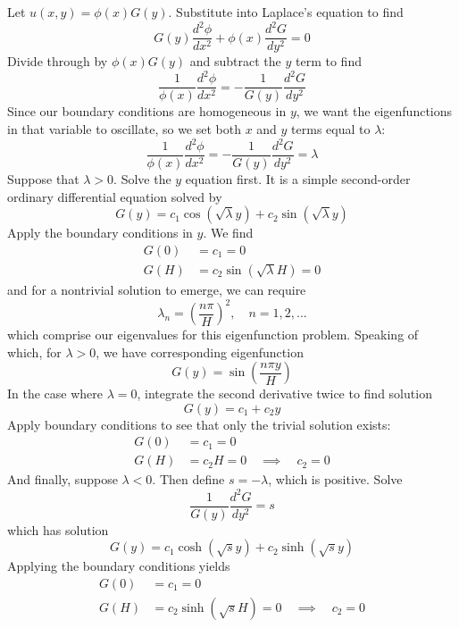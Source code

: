 \documentclass[a4paper]{article}
\begin{document}
Let \( u \!\left( x,y \right) = \phi \!\left( x \right) G \!\left( y \right) \). Substitute into Laplace's equation to find
\[
	G \!\left( y \right)\frac{d^2 \phi}{d x^2} + \phi \!\left( x \right)\frac{d^2 G}{d y^2} = 0 
\]
Divide through by \( \phi \!\left( x \right)G \!\left( y \right) \) and subtract the \( y \) term to find
\[
	\frac{1}{\phi \!\left( x \right)}\frac{d^2 \phi}{d x^2} = -\frac{1}{G \!\left( y \right)}\frac{d^2 G}{d y^2} 
\]
Since our boundary conditions are homogeneous in \( y \), we want the eigenfunctions in that variable to oscillate, so we set both \( x \) and \( y \) terms equal to \( \lambda \):
\[
	\frac{1}{\phi \!\left( x \right)}\frac{d^2 \phi}{d x^2} = -\frac{1}{G \!\left( y \right)}\frac{d^2 G}{d y^2} = \lambda
\]
Suppose that \( \lambda > 0 \). Solve the \( y \) equation first. It is a simple second-order ordinary differential equation solved by
\[
	G \!\left( y \right) = c_{1}\cos\!\left(\sqrt{\lambda}y\right) + c_{2}\sin\!\left(\sqrt{\lambda}y\right) 
\]
Apply the boundary conditions in \( y \). We find
\begin{align*}
	G \!\left( 0 \right) & = c_{1} = 0 \\
	G \!\left( H \right) & = c_{2}\sin\!\left(\sqrt{\lambda}H\right) = 0
\end{align*}
and for a nontrivial solution to emerge, we can require
\[
	\lambda_{n} = \!\left( \frac{n \pi}{H} \right)^{2}, \quad n = 1, 2, ...
\]
which comprise our eigenvalues for this eigenfunction problem. Speaking of which, for \( \lambda > 0 \), we have corresponding eigenfunction
\[
	G \!\left( y \right) = \sin\!\left(\frac{n \pi y}{H}\right) 
\]
In the case where \( \lambda = 0 \), integrate the second derivative twice to find solution
\[
	G \!\left( y \right) = c_{1} + c_{2}y 
\]
Apply boundary conditions to see that only the trivial solution exists:
\begin{align*}
	G \!\left( 0 \right) & = c_{1} = 0 \\
	G \!\left( H \right) & = c_{2}H = 0 \quad \implies \quad c_{2} = 0
\end{align*}
And finally, suppose \( \lambda < 0 \). Then define \( s = -\lambda \), which is positive. Solve
\[
	\frac{1}{G \!\left( y \right)}\frac{d^2 G}{d y^2} = s 
\]
which has solution
\[
	G \!\left( y \right) = c_{1}\cosh\!\left(\sqrt{s}y\right) + c_{2}\sinh\!\left(\sqrt{s}y\right) 
\]
Applying the boundary conditions yields
\begin{align*}
	G \!\left( 0 \right) & = c_{1} = 0 \\
	G \!\left( H \right) & = c_{2}\sinh\!\left(\sqrt{s}H\right) = 0 \quad \implies \quad c_{2} = 0
\end{align*}
\end{document}
